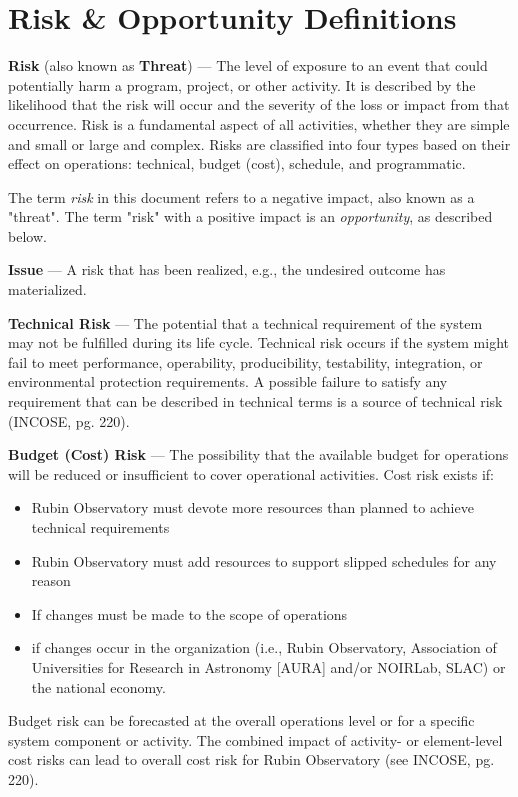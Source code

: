 \section{Risk \& Opportunity Definitions}
\label{sec:definitions}

\textbf{Risk} (also known as \textbf{Threat}) ---
The level of exposure to an event that could potentially harm a program, project, or other activity. It is described by the likelihood that the risk will occur and the severity of the loss or impact from that occurrence. Risk is a fundamental aspect of all activities, whether they are simple and small or large and complex. Risks are classified into four types based on their effect on operations: technical, budget (cost), schedule, and programmatic.

The term \emph{risk} in this document refers to a negative impact, also known as a "threat". 
The term "risk" with a positive impact is an \emph{opportunity}, as described below.

\textbf{Issue} ---
A risk that has been realized, e.g., the undesired outcome has materialized.

\textbf{Technical Risk} ---
The potential that a technical requirement of the system may not be fulfilled during its life cycle. Technical risk occurs if the system might fail to meet performance, operability, producibility, testability, integration, or environmental protection requirements. A possible failure to satisfy any requirement that can be described in technical terms is a source of technical risk (INCOSE, pg. 220).

\textbf{Budget (Cost) Risk} ---
The possibility that the available budget for operations will be reduced or insufficient to cover operational activities.
Cost risk exists if: 
\begin{itemize}
\item Rubin Observatory must devote more resources than planned to achieve technical requirements
\item Rubin Observatory must add resources to support slipped schedules for any reason
\item If changes must be made to the scope of operations
\item if changes occur in the organization (i.e., Rubin Observatory, Association of Universities for Research in Astronomy [AURA] and/or NOIRLab, SLAC) or the national economy.
\end{itemize}

Budget risk can be forecasted at the overall operations level or for a specific system component or activity. The combined impact of activity- or element-level cost risks can lead to overall cost risk for Rubin Observatory (see INCOSE, pg. 220).


